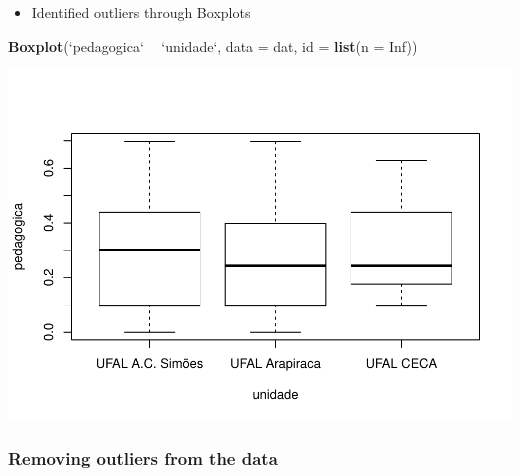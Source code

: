 \documentclass[]{article}
\newenvironment{Shaded}{\begin{snugshade}}{\end{snugshade}}
\newcommand{\CommentTok}[1]{\textcolor[rgb]{0.56,0.35,0.01}{\textit{#1}}}
\newcommand{\DataTypeTok}[1]{\textcolor[rgb]{0.13,0.29,0.53}{#1}}
\newcommand{\KeywordTok}[1]{\textcolor[rgb]{0.13,0.29,0.53}{\textbf{#1}}}
\newcommand{\NormalTok}[1]{#1}
\newcommand{\OperatorTok}[1]{\textcolor[rgb]{0.81,0.36,0.00}{\textbf{#1}}}
\newcommand{\OtherTok}[1]{\textcolor[rgb]{0.56,0.35,0.01}{#1}}
\newcommand{\StringTok}[1]{\textcolor[rgb]{0.31,0.60,0.02}{#1}}
\providecommand{\tightlist}{%
  \setlength{\itemsep}{0pt}\setlength{\parskip}{0pt}}
\begin{document}
\begin{itemize}
\tightlist
\item
  Identified outliers through Boxplots
\end{itemize}

\begin{Shaded}
\begin{Highlighting}[]
\KeywordTok{Boxplot}\NormalTok{(}\StringTok{`}\DataTypeTok{pedagogica}\StringTok{`} \OperatorTok{~}\StringTok{ `}\DataTypeTok{unidade}\StringTok{`}\NormalTok{, }\DataTypeTok{data =}\NormalTok{ dat, }\DataTypeTok{id =} \KeywordTok{list}\NormalTok{(}\DataTypeTok{n =} \OtherTok{Inf}\NormalTok{))}
\end{Highlighting}
\end{Shaded}

\includegraphics{factorialAnova_files/figure-latex/unnamed-chunk-6-1.pdf}

\hypertarget{removing-outliers-from-the-data}{%
\subsubsection{Removing outliers from the
data}\label{removing-outliers-from-the-data}}

\begin{Shaded}
\end{Shaded}
\end{document}
